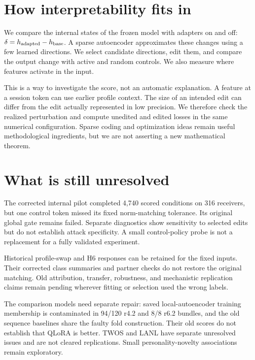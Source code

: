 \documentclass[10pt]{article}
\begin{document}
\section{How interpretability fits in}
We compare the internal states of the frozen model with adapters on and off:
$\delta=h_{\rm adapted}-h_{\rm base}$. A sparse autoencoder approximates these
changes using a few learned directions. We select candidate directions, edit
them, and compare the output change with active and random controls. We also
measure where features activate in the input.

This is a way to investigate the score, not an automatic explanation. A feature
at a session token can use earlier profile context. The size of an intended edit
can differ from the edit actually represented in low precision. We therefore
check the realized perturbation and compute unedited and edited losses in the
same numerical configuration. Sparse coding and optimization ideas remain useful
methodological ingredients, but we are not asserting a new mathematical theorem.

\section{What is still unresolved}
The corrected internal pilot completed 4,740 scored conditions on 316 receivers,
but one control token missed its fixed norm-matching tolerance. Its original
global gate remains failed. Separate diagnostics show sensitivity to selected
edits but do not establish attack specificity. A small control-policy probe is
not a replacement for a fully validated experiment.

Historical profile-swap and H6 responses can be retained for the fixed inputs.
Their corrected class summaries and partner checks do not restore the original
matching. Old attribution, transfer, robustness, and mechanistic replication
claims remain pending wherever fitting or selection used the wrong labels.

The comparison models need separate repair: saved local-autoencoder training
membership is contaminated in 94/120 r4.2 and 8/8 r6.2 bundles, and the old
sequence baselines share the faulty fold construction. Their old scores do not
establish that QLoRA is better. TWOS and LANL have separate unresolved issues and
are not cleared replications. Small personality-novelty associations remain
exploratory.
\end{document}
